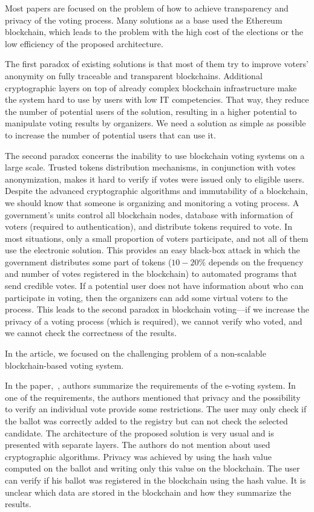 \documentclass[applsci,article,submit,moreauthors,pdftex]{Definitions/mdpi}
\begin{document}
Most papers are focused on the problem of how to achieve transparency and privacy of the voting process. Many solutions as a base used the Ethereum blockchain, which leads to the problem with the high cost of the elections or the low efficiency of the proposed architecture. 

The first paradox of existing solutions is that most of them try to improve voters' anonymity on fully traceable and transparent blockchains. Additional cryptographic layers on top of already complex blockchain infrastructure make the system hard to use by users with low IT competencies. That way, they reduce the number of potential users of the solution, resulting in a higher potential to manipulate voting results by organizers. We need a solution as simple as possible to increase the number of potential users that can use it.

The second paradox concerns the inability to use blockchain voting systems on a large scale. Trusted tokens distribution mechanisms, in conjunction with votes anonymization, makes it hard to verify if votes were issued only to eligible users. Despite the advanced cryptographic algorithms and immutability of a blockchain, we should know that someone is organizing and monitoring a voting process. A government's units control all blockchain nodes, database with information of voters (required to authentication), and distribute tokens required to vote. In most situations, only a small proportion of voters participate, and not all of them use the electronic solution. This provides an easy black-box attack in which the government distributes some part of tokens ($10-20\%$ depends on the frequency and number of votes registered in the blockchain) to automated programs that send credible votes. If a potential user does not have information about who can participate in voting, then the organizers can add some virtual voters to the process. This leads to the second paradox in blockchain voting––if we increase the privacy of a voting process (which is required), we cannot verify who voted, and we cannot check the correctness of the results. 

In the article, we focused on the challenging problem of a non-scalable blockchain-based voting system.

In the paper,~\cite{khan2018secure}, authors summarize the requirements of the e-voting system. In one of the requirements, the authors mentioned that privacy and the possibility to verify an individual vote provide some restrictions. The user may only check if the ballot was correctly added to the registry but can not check the selected candidate. The architecture of the proposed solution is very usual and is presented with separate layers. The authors do not mention about used cryptographic algorithms. Privacy was achieved by using the hash value computed on the ballot and writing only this value on the blockchain. The user can verify if his ballot was registered in the blockchain using the hash value. It is unclear which data are stored in the blockchain and how they summarize the results.
\end{document}
